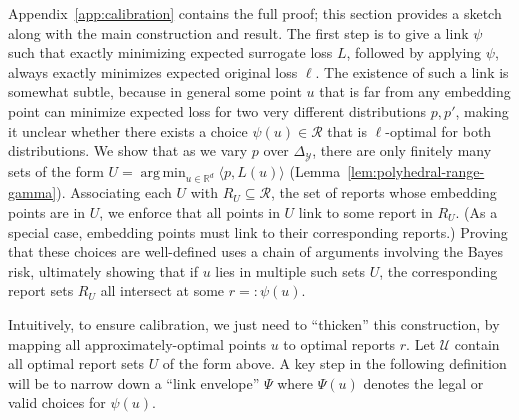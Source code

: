 \documentclass[12pt]{article}
\newcommand{\Comments}{1}
\newcommand{\mynote}[2]{\ifnum\Comments=1\textcolor{#1}{#2}\fi}
\newcommand{\bo}[1]{\mynote{blue}{[Bo: #1]}}
\newcommand{\reals}{\mathbb{R}}
\newcommand{\simplex}{\Delta_\Y}
\newcommand{\R}{\mathcal{R}}
\newcommand{\U}{\mathcal{U}}
\newcommand{\Y}{\mathcal{Y}}
\newcommand{\inprod}[2]{\langle #1, #2 \rangle}%
\newcommand{\toto}{\rightrightarrows}
\newcommand{\trim}{\mathrm{trim}}
\DeclareMathOperator*{\argmin}{arg\,min}
\newtheorem{proposition}{Proposition}
\begin{document}
Appendix~\ref{app:calibration} contains the full proof; this section provides a sketch along with the main construction and result.
The first step is to give a link $\psi$ such that exactly minimizing expected surrogate loss $L$, followed by applying $\psi$, always exactly minimizes expected original loss $\ell$.
The existence of such a link is somewhat subtle, because in general some point $u$ that is far from any embedding point can minimize expected loss for two very different distributions $p,p'$, making it unclear whether there exists a choice $\psi(u)\in\R$ that is $\ell$-optimal for both distributions.
We show that as we vary $p$ over $\simplex$, there are only finitely many sets of the form $U = \argmin_{u \in \reals^d} \inprod{p}{L(u)}$ (Lemma~\ref{lem:polyhedral-range-gamma}).
Associating each $U$ with $R_U \subseteq \R$, the set of reports whose embedding points are in $U$, we enforce that all points in $U$ link to some report in $R_U$.
(As a special case, embedding points must link to their corresponding reports.)
Proving that these choices are well-defined uses a chain of arguments involving the Bayes risk, ultimately showing that if $u$ lies in multiple such sets $U$, the corresponding report sets $R_U$ all intersect at some $r =: \psi(u)$.

%

Intuitively, to ensure calibration, we just need to ``thicken'' this construction, by mapping all approximately-optimal points $u$ to optimal reports $r$.
Let $\U$ contain all optimal report sets $U$ of the form above.
A key step in the following definition will be to narrow down a ``link envelope'' $\Psi$ where $\Psi(u)$ denotes the legal or valid choices for $\psi(u)$.
\end{document}
